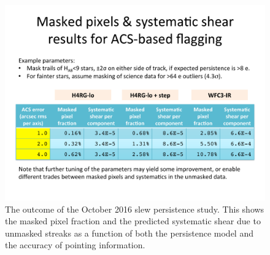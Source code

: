 \begin{figure}
\includegraphics[width=5in]{Plots/slew_results_oct16.pdf}
\caption{\label{fig:slew_results_oct16}The outcome of the October 2016 slew persistence study. This shows the masked pixel fraction and the predicted systematic shear due to unmasked streaks as a function of both the persistence model and the accuracy of pointing information.}
\end{figure}

